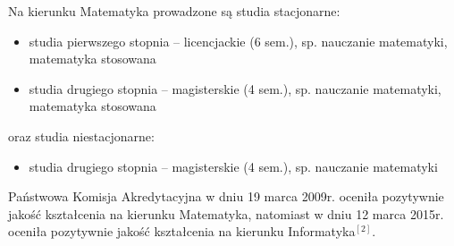 \documentclass[a4paper,12pt]{article}
\begin{document}
Na kierunku Matematyka prowadzone są studia stacjonarne:

\begin{itemize}
\item studia pierwszego stopnia – licencjackie (6 sem.), sp. nauczanie matematyki, matematyka stosowana
\item studia drugiego stopnia – magisterskie (4 sem.), sp. nauczanie matematyki, matematyka stosowana
\end{itemize}

oraz studia niestacjonarne:

\begin{itemize}
\item studia drugiego stopnia – magisterskie (4 sem.), sp. nauczanie matematyki
\end{itemize}

\newline{}Państwowa Komisja Akredytacyjna w dniu 19 marca 2009r. oceniła pozytywnie jakość kształcenia na kierunku Matematyka, natomiast w dniu 12 marca 2015r. oceniła pozytywnie jakość kształcenia na kierunku Informatyka$^{[2]}$.
\end{document}

